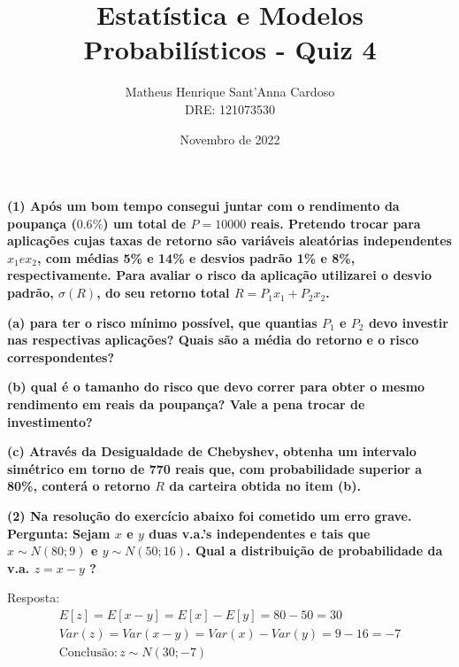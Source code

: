 \documentclass[12pt]{report}
\title{Estatística e Modelos Probabilísticos - Quiz 4}
\author{
	Matheus Henrique Sant'Anna Cardoso\\
	DRE: 121073530
}
\date{Novembro de 2022}
\newenvironment{boldenv}
  {\bfseries}%
  {}%
\begin{document}
    \maketitle \newpage

\begin{boldenv}
(1) Após um bom tempo consegui juntar com o rendimento da poupança ($0.6\%$) um total de $P = 10000$ reais. Pretendo trocar para aplicações cujas taxas de retorno são variáveis aleatórias independentes $x_1 e x_2$, com médias 5\% e 14\% e desvios padrão 1\% e 8\%, respectivamente. Para avaliar o risco da aplicação utilizarei o desvio padrão, $\sigma(R)$, do seu retorno total $R=P_1x_1 + P_2x_2$.
\end{boldenv}

\begin{boldenv}
(a) para ter o risco mínimo possível, que quantias $P_1$ e $P_2$ devo investir nas respectivas aplicações? Quais são a média do retorno e o risco correspondentes?
\end{boldenv}

\begin{boldenv}
(b) qual é o tamanho do risco que devo correr para obter o mesmo rendimento em reais da poupança? Vale a pena trocar de investimento?
\end{boldenv}

\begin{boldenv}
(c) Através da Desigualdade de Chebyshev, obtenha um intervalo simétrico em torno de 770 reais que, com probabilidade superior a 80\%, conterá o retorno $R$ da carteira obtida no item (b).
\end{boldenv}


\vspace{\baselineskip}

\begin{boldenv}
(2) Na resolução do exercício abaixo foi cometido um erro grave. Pergunta: Sejam $x$ e $y$ duas v.a.'s independentes e tais que $x \sim N (80; 9)$ e $y \sim N (50; 16)$. Qual a distribuição de probabilidade da v.a. $z = x - y$ ?

Resposta:
\end{boldenv}
\begin{align*}
E[z] = E[x - y] = E[x] - E[y] = 80 - 50 = 30\\
Var(z) = Var(x - y) = Var(x) - Var(y) = 9 - 16 = -7\\
\text{Conclusão}: z \sim N (30; -7)
\end{align*}
\end{document}
